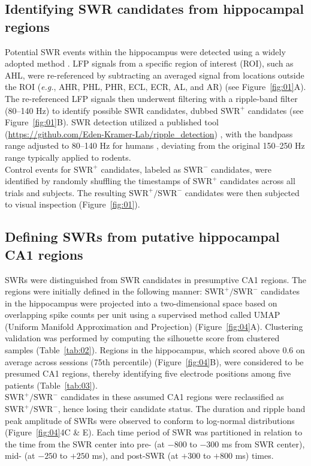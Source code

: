 \subsection{Identifying SWR candidates from hippocampal regions}
Potential SWR events within the hippocampus were detected using a widely adopted method \cite{liu_consensus_2022}. LFP signals from a specific region of interest (ROI), such as AHL, were re-referenced by subtracting an averaged signal from locations outside the ROI (\textit{e.g.}, AHR, PHL, PHR, ECL, ECR, AL, and AR) (see Figure~\ref{fig:01}A). The re-referenced LFP signals then underwent filtering with a ripple-band filter (80--140 Hz) to identify possible SWR candidates, dubbed $\textrm{SWR}^+$ candidates (see Figure~\ref{fig:01}B). SWR detection utilized a published tool (\url{https://github.com/Eden-Kramer-Lab/ripple_detection}) \cite{kay_hippocampal_2016}, with the bandpass range adjusted to 80--140 Hz for humans \cite{norman_hippocampal_2019} \cite{norman_hippocampal_2021}, deviating from the original 150--250 Hz range typically applied to rodents.
\\
\indent
Control events for $\textrm{SWR}^+$ candidates, labeled as $\textrm{SWR}^-$ candidates, were identified by randomly shuffling the timestamps of $\textrm{SWR}^+$ candidates across all trials and subjects. The resulting $\textrm{SWR}^+/\textrm{SWR}^-$ candidates were then subjected to visual inspection (Figure~\ref{fig:01}).

\subsection{Defining SWRs from putative hippocampal CA1 regions}
SWRs were distinguished from SWR candidates in presumptive CA1 regions. The regions were initially defined in the following manner: $\textrm{SWR}^+/\textrm{SWR}^-$ candidates in the hippocampus were projected into a two-dimensional space based on overlapping spike counts per unit using a supervised method called UMAP (Uniform Manifold Approximation and Projection) \cite{mcinnes_umap_2018} (Figure~\ref{fig:04}A). Clustering validation was performed by computing the silhouette score \cite{rousseeuw_silhouettes_1987} from clustered samples (Table~\ref{tab:02}). Regions in the hippocampus, which scored above 0.6 on average across sessions (75th percentile) (Figure~\ref{fig:04}B), were considered to be presumed CA1 regions, thereby identifying five electrode positions among five patients (Table~\ref{tab:03}).
\\
\indent
$\textrm{SWR}^+/\textrm{SWR}^-$ candidates in these assumed CA1 regions were reclassified as $\textrm{SWR}^+/\textrm{SWR}^-$, hence losing their candidate status. The duration and ripple band peak amplitude of SWRs were observed to conform to log-normal distributions (Figure~\ref{fig:04}4C \& E). Each time period of SWR was partitioned in relation to the time from the SWR center into pre- (at $-800$ to $-300$ ms from SWR center), mid- (at $-250$ to $+250$ ms), and post-SWR (at $+300$ to $+800$ ms) times.

